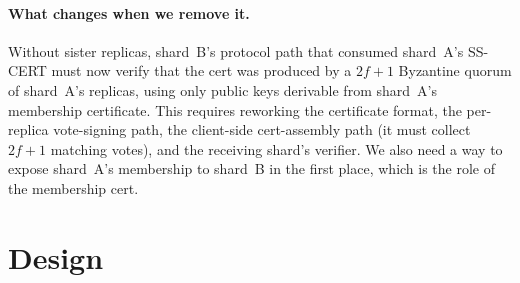 \documentclass[letterpaper,twocolumn,10pt]{article}
\begin{document}
\paragraph{What changes when we remove it.} Without sister replicas,
shard~B's protocol path that consumed shard~A's SS-CERT must now
verify that the cert was produced by a $2f{+}1$ Byzantine quorum of
shard~A's replicas, using only public keys derivable from shard~A's
membership certificate. This requires reworking the certificate format,
the per-replica vote-signing path, the client-side cert-assembly path
(it must collect $2f{+}1$ matching votes), and the receiving shard's
verifier. We also need a way to expose shard~A's membership to
shard~B in the first place, which is the role of the membership cert.


\section{Design}
\end{document}
